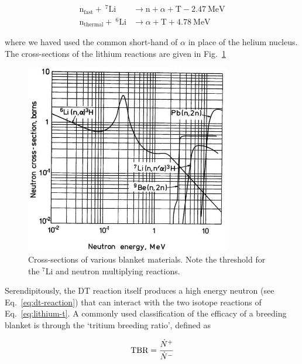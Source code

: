 \begin{subequations}\label{eq:lithium-t}
\begin{align}
	\mathrm{n}_\text{fast} + ~^7\mathrm{Li} &\xrightarrow ~\mathrm{n}+\alpha + \mathrm{T} -2.47~\text{MeV}\label{eq:li7-t}\\
	\mathrm{n}_\text{thermal} + ~^6\mathrm{Li} &\xrightarrow ~ \alpha + \mathrm{T} +4.78~\text{MeV} \label{eq:li6-t}
\end{align}
\end{subequations}

where we haved used the common short-hand of $\alpha$ in place of the helium nucleus. The cross-sections of the lithium reactions are given in Fig.~\ref{fig:li-xsects}

\begin{figure}
	\centering
	\includegraphics[width=0.8\textwidth]{chapters/figures/breeding_xsecs} 
	\caption{Cross-sections of various blanket materials. Note the threshold for the $^7$Li and neutron multiplying reactions.}
	\label{fig:li-xsects}
\end{figure}

Serendipitously, the DT reaction itself produces a high energy neutron (see Eq.~\ref{eq:dt-reaction}) that can interact with the two isotope reactions of Eq.~\ref{eq:lithium-t}. A commonly used classification of the efficacy of a breeding blanket is through the `tritium breeding ratio', defined as 

\begin{equation}
	\text{TBR} = \cfrac{\dot{N}^+}{\dot{N}^-}
\end{equation}

